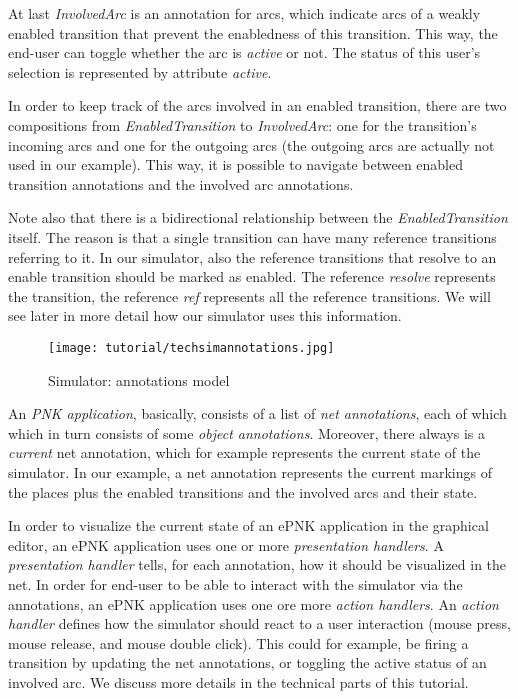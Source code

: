 At last \emph{InvolvedArc} is an annotation for arcs, which indicate arcs
of a weakly enabled transition that prevent the enabledness of this
transition. This way, the end-user can toggle whether the arc is \emph{active}
or not. The status of this user's selection is represented by attribute
\emph{active}.

In order to keep track of the arcs involved in an enabled transition, there
are two compositions from \emph{EnabledTransition} to \emph{InvolvedArc}: one
for the transition's incoming arcs and one for the outgoing arcs (the outgoing
arcs are actually not used in our example). This way, it is possible to navigate
between enabled transition annotations and the involved arc annotations.

Note also that there is a bidirectional relationship between the
\emph{EnabledTransition} itself. The reason is that a single transition can have
many reference transitions referring to it. In our simulator, also the
reference transitions that resolve to an enable transition should be marked as
enabled. The reference \emph{resolve} represents the transition, the reference
\emph{ref} represents all the reference transitions. We will see later in more
detail how our simulator uses this information.

\begin{figure}[hbtp!!]
  \centerline{\texttt{[image: tutorial/techsimannotations.jpg]}}
  \caption{Simulator: annotations model}
  \label{fig:tutorial:concepts:app:annot:model}
\end{figure}

An \emph{PNK application}, basically, consists of a list of
\emph{net annotations}, each of which which in turn consists of some
\emph{object annotations}.
Moreover, there always is a \emph{current} net annotation, which for example
represents the current state of the simulator. In our example, a net annotation represents
the current markings of the places plus the enabled transitions and the involved
arcs and their state.

In order to visualize the current state of an ePNK application in the graphical
editor, an ePNK application uses one or more \emph{presentation handlers}. A 
\emph{presentation handler} tells, for each annotation, how it should be
visualized in the net.
In order for end-user to be able to interact with the simulator via
the annotations, an ePNK application uses one ore more \emph{action
handlers}.
An \emph{action handler} defines how the simulator should react to a user interaction (mouse
press, mouse release, and mouse double click). This could for example, be
firing a transition by updating the net annotations, or toggling the active status 
of an involved arc. We discuss more details in the technical parts of
this tutorial.

